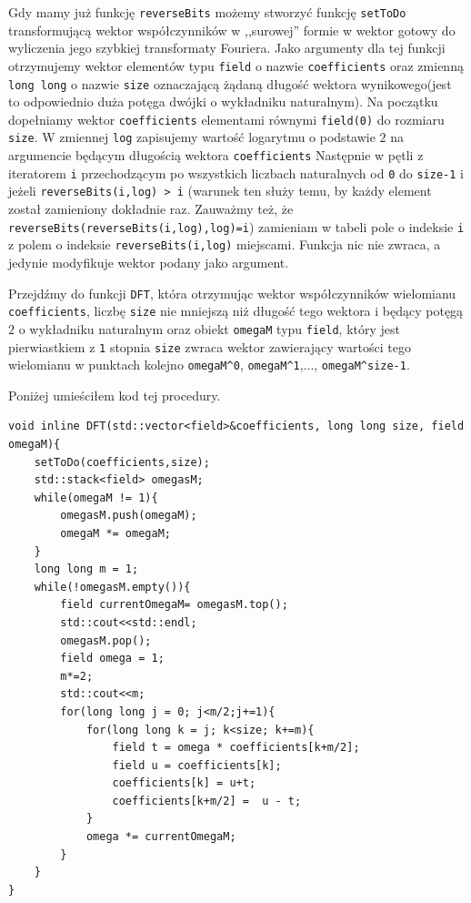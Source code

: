 \documentclass{article}
\begin{document}
Gdy mamy już funkcję \texttt{reverseBits} możemy stworzyć funkcję \texttt{setToDo} transformującą wektor współczynników w ,,surowej'' formie w wektor gotowy
do wyliczenia jego szybkiej transformaty Fouriera. Jako argumenty dla tej funkcji otrzymujemy wektor elementów typu \texttt{field} o nazwie 
\texttt{coefficients} oraz 
zmienną \texttt{long long} o nazwie \texttt{size} oznaczającą żądaną długość wektora wynikowego(jest to odpowiednio duża potęga dwójki o wykładniku naturalnym). 
Na początku dopełniamy wektor 
\texttt{coefficients} elementami równymi \texttt{field(0)} do rozmiaru \texttt{size}. 
W zmiennej \texttt{log} zapisujemy wartość logarytmu o podstawie $2$ na argumencie będącym długością
wektora \texttt{coefficients}
Następnie w pętli z iteratorem \texttt{i} przechodzącym po wszystkich liczbach naturalnych od \texttt{0} do 
\texttt{size-1} i jeżeli \texttt{reverseBits(i,log) > i} (warunek ten służy temu, by każdy element został zamieniony dokładnie raz. 
Zauważmy też, że \texttt{reverseBits(reverseBits(i,log),log)=i}) zamieniam w tabeli pole o indeksie \texttt{i} z polem o indeksie 
\texttt{reverseBits(i,log)} miejscami. Funkcja nic nie zwraca, a jedynie modyfikuje wektor podany jako argument.

Przejdźmy do funkcji \texttt{DFT}, która otrzymując wektor współczynników wielomianu \texttt{coefficients}, 
liczbę \texttt{size} nie mniejszą niż długość tego wektora i będący potęgą $2$ o wykładniku naturalnym oraz obiekt \texttt{omegaM} typu \texttt{field},
który jest pierwiastkiem z \texttt{1} stopnia \texttt{size} zwraca wektor zawierający wartości tego wielomianu w punktach kolejno 
\texttt{omegaM}\verb!^!\texttt{0}, \texttt{omegaM}\verb!^!\texttt{1},..., \texttt{omegaM}\verb!^!\texttt{size-1}. 

Poniżej umieściłem kod tej procedury.

\begin{verbatim}
void inline DFT(std::vector<field>&coefficients, long long size, field omegaM){
    setToDo(coefficients,size);
    std::stack<field> omegasM;
    while(omegaM != 1){
        omegasM.push(omegaM);
        omegaM *= omegaM;
    }
    long long m = 1;
    while(!omegasM.empty()){   
        field currentOmegaM= omegasM.top();
        std::cout<<std::endl;
        omegasM.pop();
        field omega = 1;
        m*=2;
        std::cout<<m;
        for(long long j = 0; j<m/2;j+=1){
            for(long long k = j; k<size; k+=m){
                field t = omega * coefficients[k+m/2];
                field u = coefficients[k];
                coefficients[k] = u+t;
                coefficients[k+m/2] =  u - t;
            }
            omega *= currentOmegaM;
        }
    }
}
\end{verbatim}
\end{document}

